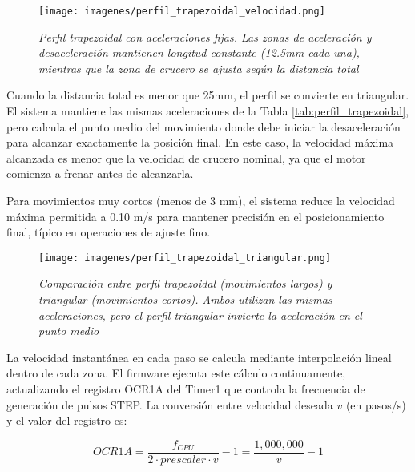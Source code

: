 \begin{figure}[H]
    \centering
    \texttt{[image: imagenes/perfil\_trapezoidal\_velocidad.png]}
    \caption{\textit{Perfil trapezoidal con aceleraciones fijas. Las zonas de aceleración y desaceleración mantienen longitud constante (12.5mm cada una), mientras que la zona de crucero se ajusta según la distancia total}}
    \label{fig:perfil_trapezoidal}
\end{figure}

Cuando la distancia total es menor que 25mm, el perfil se convierte en triangular. El sistema mantiene las mismas aceleraciones de la Tabla \ref{tab:perfil_trapezoidal}, pero calcula el punto medio del movimiento donde debe iniciar la desaceleración para alcanzar exactamente la posición final. En este caso, la velocidad máxima alcanzada es menor que la velocidad de crucero nominal, ya que el motor comienza a frenar antes de alcanzarla. 

Para movimientos muy cortos (menos de 3 mm), el sistema reduce la velocidad máxima permitida a 0.10 m/s para mantener precisión en el posicionamiento final, típico en operaciones de ajuste fino.

\begin{figure}[H]
    \centering
    \texttt{[image: imagenes/perfil\_trapezoidal\_triangular.png]}
    \caption{\textit{Comparación entre perfil trapezoidal (movimientos largos) y triangular (movimientos cortos). Ambos utilizan las mismas aceleraciones, pero el perfil triangular invierte la aceleración en el punto medio}}
    \label{fig:perfil_comparacion}
\end{figure}

La velocidad instantánea en cada paso se calcula mediante interpolación lineal dentro de cada zona. El firmware ejecuta este cálculo continuamente, actualizando el registro OCR1A del Timer1 que controla la frecuencia de generación de pulsos STEP. La conversión entre velocidad deseada $v$ (en pasos/s) y el valor del registro es:

\begin{equation}
OCR1A = \frac{f_{CPU}}{2 \cdot prescaler \cdot v} - 1 = \frac{1,000,000}{v} - 1
\end{equation}

